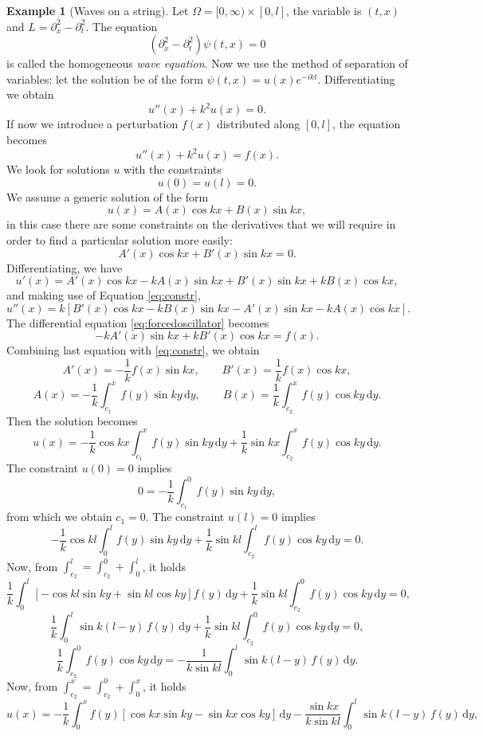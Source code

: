 \documentclass[a4paper,11pt]{article}	%
\theoremstyle{classicthm}
\theoremstyle{definition}
\theoremstyle{definition}
\newtheorem{example}[theorem]{Example}
\newenvironment{esempio}{\begin{example}}{
	\end{example}}
\newcommand{\dd}{\mathrm d}
\begin{document}
\begin{esempio}[Waves on a string]
	Let $\Omega=[0,\infty)\times[0,l]$, the variable is $(t,x)$ and $L=\partial_x^2-\partial_t^2$. The equation
	\[	(\partial_x^2-\partial_t^2)\psi(t,x)=0	\]
	is called the homogeneous \emph{wave equation}. Now we use the method of separation of variables: let the solution be of the form $\psi(t,x)=u(x)e^{-ikt}$. Differentiating we obtain
	\[	u''(x)+k^2u(x)=0.		\]
	If now we introduce a perturbation $f(x)$ distributed along $[0,l]$, the equation becomes
	\begin{equation}
		u''(x)+k^2u(x)=f(x).
		\label{eq:forcedoscillator}
	\end{equation}
	We look for solutions $u$ with the constraints
	\[	u(0)=u(l)=0.		\]
	We assume a generic solution of the form
	\[	u(x)=A(x)\cos kx+B(x)\sin kx, 		\]
	in this case there are some constraints on the derivatives that we will require in order to find a particular solution more easily:
	\begin{equation}
		A'(x)\cos kx+B'(x)\sin kx=0.
		\label{eq:constr}
	\end{equation}
	Differentiating, we have
	\[	u'(x)=A'(x)\cos kx -kA(x)\sin kx+B'(x)\sin kx+kB(x)\cos kx,		\]
	and making use of Equation \eqref{eq:constr},
	\[	u''(x)=k\left[B'(x)\cos kx-k B(x)\sin kx -A'(x)\sin kx-k A(x)\cos kx \right].		\]
	The differential equation \eqref{eq:forcedoscillator} becomes
	\[	-kA'(x)\sin kx +k B'(x)\cos kx=f(x).		\]
	Combining last equation with \eqref{eq:constr}, we obtain
	\[	A'(x)=-\frac1k	f(x)\sin kx,\qquad B'(x)=\frac1k f(x)\cos kx,	\]
	\[	A(x)=-\frac1k \int_{c_1}^{x}f(y)\sin ky\,\dd y,\qquad B(x)=\frac1k\int_{c_2}^{x} f(y)\cos ky	\,\dd y.		\]
	Then the solution becomes
	\[	u(x)=-\frac1k \cos kx\int_{c_1}^{x}f(y)\sin ky\,\dd y+\frac1k \sin kx \int_{c_2}^{x} f(y)\cos ky	\,\dd y.			\] 
	The constraint $u(0)=0$ implies
	\[	0=-\frac1k\int_{c_1}^{0}f(y)\sin ky\,\dd y,		\]
	from which we obtain $c_1=0$.
	The constraint $u(l)=0$ implies
	\[	-\frac1k \cos kl\int_{0}^{l}f(y)\sin ky\,\dd y+\frac1k \sin kl \int_{c_2}^{l} f(y)\cos ky	\,\dd y	=0.		\]
	Now, from $\int_{c_2}^{l}=\int_{c_2}^{0}+\int_{0}^{l}$, it holds
	\[	\frac1k\int_{0}^{l}\left[-\cos kl\sin ky+\sin kl\cos ky\right]f(y)\,\dd y+\frac1k\sin kl\int_{c_2}^{0}f(y)\cos ky\,\dd y=0,		\]
	\[	\frac1k\int_{0}^{l}\sin  k(l-y)\,f(y)\,\dd y+\frac1k\sin kl\int_{c_2}^{0}f(y)\cos ky\,\dd y=0,		\]
	\[	\frac1k\int_{c_2}^{0}f(y)\cos ky\,\dd y=-\frac1{k\sin kl}\int_{0}^{l}\sin  k(l-y)\,f(y)\,\dd y.		\]
	Now, from $\int_{c_2}^{x}=\int_{c_2}^{0}+\int_{0}^{x}$, it holds
	\[	u(x)=-\frac1k \int_{0}^{x}f(y)\left[\cos kx\sin ky-\sin kx\cos ky\right]\,\dd y-\frac{\sin kx}{k\sin kl}\int_{0}^{l}\sin  k(l-y)\,f(y)\,\dd y,	\]

\end{esempio}
\end{document}
